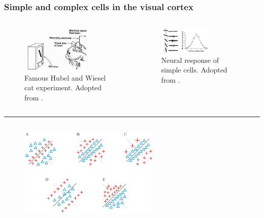 \documentclass[a4paper,9pt]{beamer}
\theoremstyle{mytheoremstyle}
\begin{document}
\begin{frame}
\frametitle{Simple and complex cells in the visual cortex}
\begin{columns}
\begin{figure}
\begin{center}
  \includegraphics[width=0.75\textwidth]{res/hubel-experiment-cat.png}
\end{center}
	\caption{Famous Hubel and Wiesel cat experiment. Adopted from \parencite{hubel1959}.}
\end{figure}
\vspace{0.8cm}
\begin{figure}
\begin{center}
  \includegraphics[width=0.6\textwidth]{res/hubel-experiment-cat-2.png}
\end{center}
	\caption{Neural response of simple cells. Adopted from \parencite{hubel1962}.}
\end{figure}
\end{columns}
\hrule
\begin{columns}
\begin{figure}
\begin{center}
  \includegraphics[width=0.6\textwidth]{res/simple_cells.png}

\end{center}
\end{figure}
\end{columns}
\end{frame}
\end{document}
